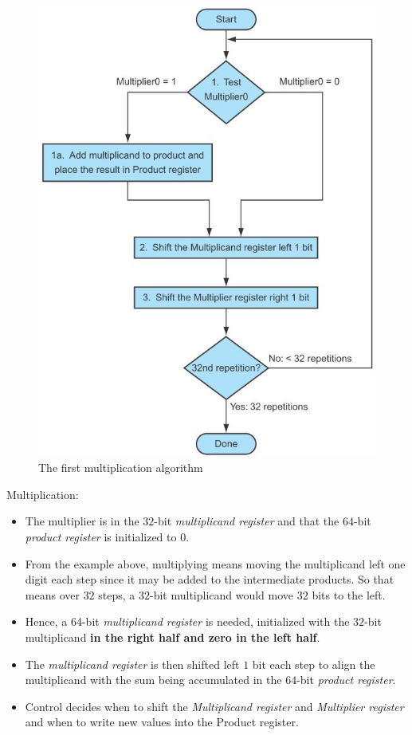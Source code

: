 \documentclass[10pt,a4paper]{article}
\begin{document}
\begin{figure} [h!]
    \centering
    \includegraphics[scale=0.71]{Multiply flow.JPG}
    \caption{The ﬁrst multiplication algorithm}
\end{figure}

Multiplication:
\begin{itemize}
    \item The multiplier is in the $32$-bit \textit{multiplicand register} and that the $64$-bit \textit{product register} is initialized to $0$. 
    \item From the example above, multiplying means moving the multiplicand left one digit each step
    since it may be added to the intermediate products. So that means over $32$ steps, a $32$-bit
    multiplicand would move $32$ bits to the left.
    \item  Hence, a 64-bit \textit{multiplicand register} is needed, initialized with the $32$-bit
    multiplicand \textbf{in the right half and zero in the left half}.
    \item The \textit{multiplicand register} is then shifted left $1$ bit each step to align the
    multiplicand with the sum being accumulated in the $64$-bit \textit{product register}.
    \item Control decides when to shift the \textit{Multiplicand register} and \textit{Multiplier register} and when to write new values into the Product register.
\end{itemize}   
\end{document}
